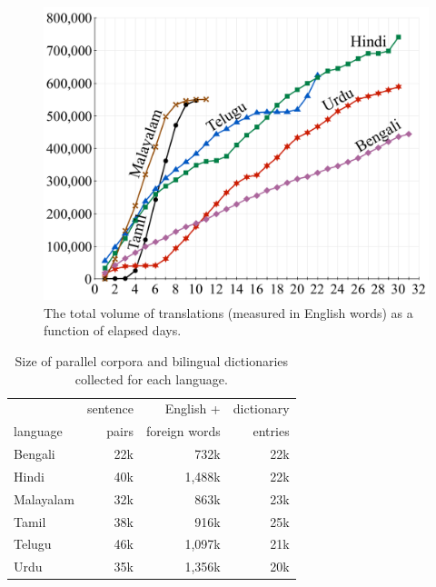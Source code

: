 \documentclass[11pt]{article}
\begin{document}
\begin{figure}[t]
  \includegraphics[width=\linewidth]{figures/volume}
  \caption{The total volume of translations (measured in English words)
    as a function of elapsed days. }
  \label{figure:volume-of-data-by-language}
\end{figure}





\begin{table}[t]
  \centering
  \small
  \begin{tabular}{l|rrr}
    		 & sentence   &  English + & dictionary  \\
    language &  pairs  & foreign words &  entries \\
    \hline\hline
    Bengali & 22k & 732k   & 22k \\
    Hindi   &  40k & 1,488k & 22k \\
    Malayalam & 32k & 863k & 23k \\
    Tamil & 38k & 916k & 25k \\
    Telugu & 46k & 1,097k & 21k \\
    Urdu & 35k & 1,356k & 20k \\
  \end{tabular}
  \caption{Size of parallel corpora and bilingual dictionaries collected for each language. }
  \label{table:data-size}
\end{table}
\end{document}
